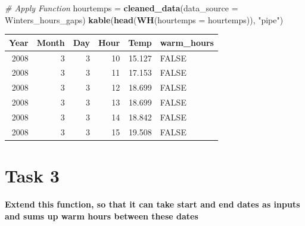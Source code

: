 \documentclass[
]{book}
\newenvironment{Shaded}{\begin{snugshade}}{\end{snugshade}}
\newcommand{\CommentTok}[1]{\textcolor[rgb]{0.56,0.35,0.01}{\textit{#1}}}
\newcommand{\DataTypeTok}[1]{\textcolor[rgb]{0.13,0.29,0.53}{#1}}
\newcommand{\KeywordTok}[1]{\textcolor[rgb]{0.13,0.29,0.53}{\textbf{#1}}}
\newcommand{\NormalTok}[1]{#1}
\newcommand{\StringTok}[1]{\textcolor[rgb]{0.31,0.60,0.02}{#1}}
\begin{document}
\begin{Shaded}
\begin{Highlighting}[]
\CommentTok{# Apply Function}
\NormalTok{hourtemps =}\StringTok{ }\KeywordTok{cleaned_data}\NormalTok{(}\DataTypeTok{data_source =}\NormalTok{ Winters_hours_gaps)}
\KeywordTok{kable}\NormalTok{(}\KeywordTok{head}\NormalTok{(}\KeywordTok{WH}\NormalTok{(}\DataTypeTok{hourtemps =}\NormalTok{ hourtemps)), }\StringTok{"pipe"}\NormalTok{)}
\end{Highlighting}
\end{Shaded}

\begin{longtable}[]{@{}rrrrrl@{}}
\toprule
Year & Month & Day & Hour & Temp & warm\_hours\tabularnewline
\midrule
\endhead
2008 & 3 & 3 & 10 & 15.127 & FALSE\tabularnewline
2008 & 3 & 3 & 11 & 17.153 & FALSE\tabularnewline
2008 & 3 & 3 & 12 & 18.699 & FALSE\tabularnewline
2008 & 3 & 3 & 13 & 18.699 & FALSE\tabularnewline
2008 & 3 & 3 & 14 & 18.842 & FALSE\tabularnewline
2008 & 3 & 3 & 15 & 19.508 & FALSE\tabularnewline
\bottomrule
\end{longtable}

\hypertarget{task-3-1}{%
\section{Task 3}\label{task-3-1}}

\textbf{Extend this function, so that it can take start and end dates as inputs and sums up warm hours between these dates}
\end{document}
